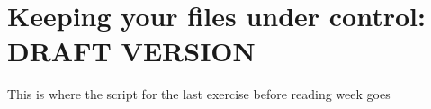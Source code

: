 \chapter[Version Control]{Keeping your files under control: DRAFT VERSION}
\minitoc
{}

\begin{note}
  This is where the script for the last exercise before reading week goes

\end{note}

